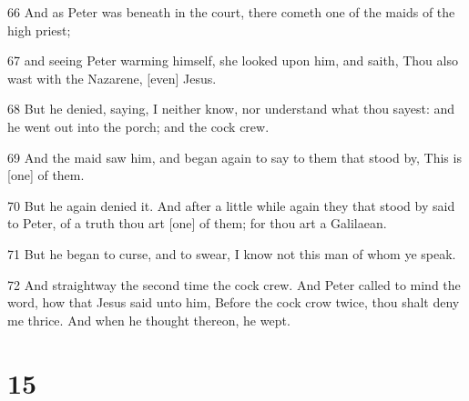 \par 66 And as Peter was beneath in the court, there cometh one of the maids of the high priest;
\par 67 and seeing Peter warming himself, she looked upon him, and saith, Thou also wast with the Nazarene, [even] Jesus.
\par 68 But he denied, saying, I neither know, nor understand what thou sayest: and he went out into the porch; and the cock crew.
\par 69 And the maid saw him, and began again to say to them that stood by, This is [one] of them.
\par 70 But he again denied it. And after a little while again they that stood by said to Peter, of a truth thou art [one] of them; for thou art a Galilaean.
\par 71 But he began to curse, and to swear, I know not this man of whom ye speak.
\par 72 And straightway the second time the cock crew. And Peter called to mind the word, how that Jesus said unto him, Before the cock crow twice, thou shalt deny me thrice. And when he thought thereon, he wept.

\chapter{15}


